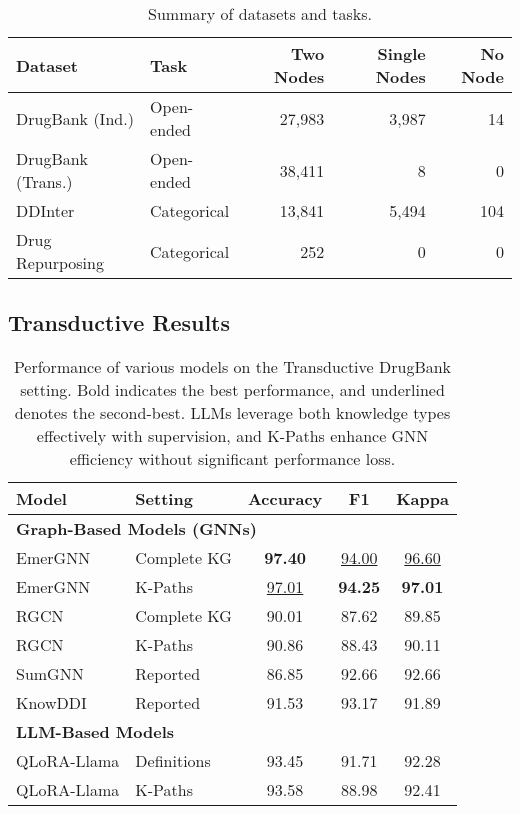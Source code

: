 \begin{table}[t]
    \centering
    \scriptsize %
    \setlength{\tabcolsep}{2pt} %
    \renewcommand{\arraystretch}{1.1} %
    \begin{tabular}{@{}lp{1.8cm}rrr@{}}
        \toprule
        \textbf{Dataset} & \textbf{Task} & \textbf{Two Nodes} & \textbf{Single Nodes} & \textbf{No Node} \\ 
        \midrule
        DrugBank (Ind.) & Open-ended & 27,983 & 3,987 & 14 \\ 
        DrugBank (Trans.) & Open-ended & 38,411 & 8 & 0 \\ 
        DDInter & Categorical & 13,841 & 5,494 & 104 \\ 
        Drug Repurposing & Categorical & 252 & 0 & 0 \\ 
        \bottomrule
    \end{tabular}
    \caption{Summary of datasets and tasks.}
    \label{tab:datasets}
\end{table}



 

\subsection{Transductive Results}\label{sec-transd}
\begin{table}[t]
    \centering
    \footnotesize %
    \renewcommand{\arraystretch}{0.9} %
    \setlength{\tabcolsep}{4pt} %
    \begin{tabular}{llccc}
        \toprule
        \textbf{Model} & \textbf{Setting} & \textbf{Accuracy} & \textbf{F1} & \textbf{Kappa} \\
        \midrule
        \multicolumn{5}{l}{\textbf{Graph-Based Models (GNNs)}} \\
        EmerGNN & Complete KG & \textbf{97.40} & \underline{94.00} & \underline{96.60} \\
        EmerGNN & K-Paths & \underline{97.01} & \textbf{94.25} & \textbf{97.01} \\
        RGCN & Complete KG & 90.01 & 87.62 & 89.85 \\
        RGCN & K-Paths & 90.86 & 88.43 & 90.11 \\
        SumGNN & Reported & 86.85 & 92.66 & 92.66 \\
        KnowDDI & Reported & 91.53 & 93.17 & 91.89 \\
        \midrule
        \multicolumn{5}{l}{\textbf{LLM-Based Models}} \\
        QLoRA-Llama & Definitions & 93.45 & 91.71 & 92.28 \\
        QLoRA-Llama & K-Paths & 93.58 & 88.98 & 92.41 \\
        \bottomrule
    \end{tabular}
    \caption{Performance of various models on the Transductive DrugBank setting. Bold indicates the best performance, and
underlined denotes the second-best. LLMs leverage both knowledge types effectively with supervision, and K-Paths enhance GNN efficiency
without significant performance loss.}
    \label{tab:results-transductive}
\end{table}

